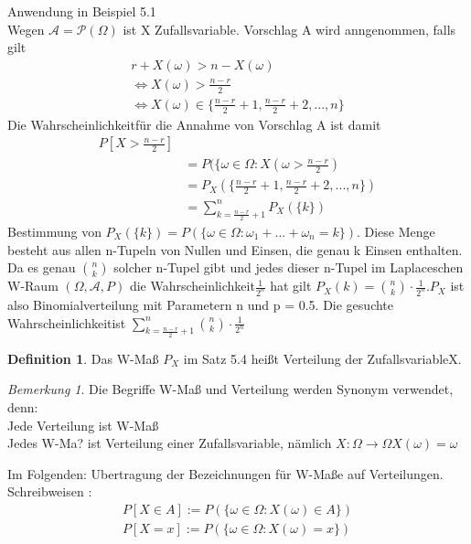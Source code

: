 \documentclass[a4paper,12pt,fleqn]{scrartcl}
\newcommand{\m}[1]{\mathcal{ #1 }}
\newcommand{\Wk}{Wahrscheinlichkeit}
\newcommand{\ZV}{Zufallsvariable}
\theoremstyle{definition}
\newtheorem{definition}{Definition}[section]
\theoremstyle{plain}
\theoremstyle{remark}
\newtheorem*{bemerkung}{Bemerkung}
\begin{document}
Anwendung in Beispiel 5.1 \\
Wegen $\m{A} = \m{P}( \Omega) $ ist X \ZV. Vorschlag A wird anngenommen, falls gilt
\begin{align*}
r + X(\omega) > n - X( \omega ) \\
\Leftrightarrow X( \omega) > \frac{n-r}{2} \\
\Leftrightarrow X( \omega) \in \{ \frac{n-r}{2}+1,\frac{n-r}{2}+2,...,n \}
\end{align*}  
Die \Wk für die Annahme von Vorschlag A ist damit 
\begin{align*}
P[X > \frac{n-r}{2} ] \\
&= P( \{ \omega \in \Omega : X( \omega >  \frac{n-r}{2}) \\
&= P_X( \{ \frac{n-r}{2}+1,\frac{n-r}{2}+2,...,n \} ) \\
&= \sum_{k = \frac{n-r}{2}+1}^n {P_X( \{ k \} )}
\end{align*}  
Bestimmung von $P_X( \{ k \} ) = P( \{ \omega \in \Omega : \omega_1 + ... + \omega_n = k \} )$.  Diese Menge besteht aus allen n-Tupeln von Nullen und Einsen, die genau k Einsen enthalten. Da es genau  $\binom{n}{k}$   solcher n-Tupel gibt und jedes dieser n-Tupel im Laplaceschen W-Raum  $( \Omega , \m{A} , P)$ die \Wk $\frac{1}{2^n}$ hat gilt $P_X(k) = \binom{n}{k} \cdot \frac{1}{2^n}. P_X$  ist also Binomialverteilung mit Parametern n und p = 0.5. Die gesuchte \Wk ist $\sum_{k= \frac{n-r}{2} +1}^n{\binom{n}{k} \cdot \frac{1}{2^n}}$

\begin{definition}
Das W-Maß $P_X$ im Satz 5.4 heißt Verteilung der \ZV X.
\end{definition}

\begin{bemerkung}
Die Begriffe W-Maß und Verteilung werden Synonym verwendet, denn: \\
Jede Verteilung ist W-Maß \\
Jedes W-Ma? ist Verteilung einer \ZV, nämlich $X: \Omega \rightarrow \Omega X( \omega) = \omega $
\end{bemerkung}
Im Folgenden: Ubertragung der Bezeichnungen für W-Maße auf Verteilungen. \\
Schreibweisen : 
\begin{align*}
P[X \in A] := P( \{ \omega \in \Omega : X(\omega ) \in A \} ) \\
P[X = x] := P( \{ \omega \in \Omega : X(\omega ) = x \} )
\end{align*}
\end{document}
